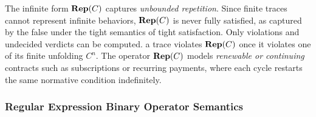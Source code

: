   The infinite form $\mathbf{Rep}(C)$ captures \emph{unbounded repetition}.
  Since finite traces cannot represent infinite behaviors, $\mathbf{Rep}(C)$ is never fully satisfied, as captured by the \textsf{false} under the tight semantics of tight satisfaction. Only violations and undecided verdicts can be computed.
  a trace violates $\mathbf{Rep}(C)$ once it violates one of its finite unfolding $C^n$.
  The operator $\mathbf{Rep}(C)$ models \emph{renewable or continuing} contracts such as subscriptions or recurring payments, where each cycle restarts the same normative condition indefinitely.

  \subsubsection*{Regular Expression Binary Operator Semantics}

  \label{sec:regex-contract}

